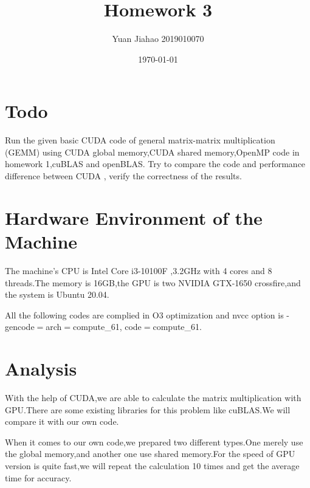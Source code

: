 \documentclass[11pt]{scrartcl} %
\title{	
	Homework 3
}
\author{Yuan Jiahao 2019010070} %
\date{\normalsize\today} %
\begin{document}
\maketitle %


\section{Todo}
Run the given basic CUDA code of general matrix-matrix multiplication (GEMM) using
CUDA global memory,CUDA shared memory,OpenMP code in homework 1,cuBLAS and openBLAS. Try to compare the code and performance difference between CUDA
, verify the correctness of the results.
\section{Hardware Environment of the Machine }
The machine's CPU is Intel Core i3-10100F ,3.2GHz with 4 cores and 8 threads.The memory is 16GB,the GPU is two NVIDIA GTX-1650 crossfire,and the system is Ubuntu 20.04.

All the following codes are complied in O3 optimization and nvcc option is -gencode$=$arch$=$compute\_61, code$=$compute\_61.
\section{Analysis}
With the help of CUDA,we are able to calculate the matrix multiplication with GPU.There are some existing libraries for this problem like cuBLAS.We will compare it with our own code.

When it comes to our own code,we prepared two different types.One merely use the global memory,and another one use shared memory.For the speed of GPU version is quite fast,we will repeat the calculation 10 times and get the average time for accuracy.
\end{document}
